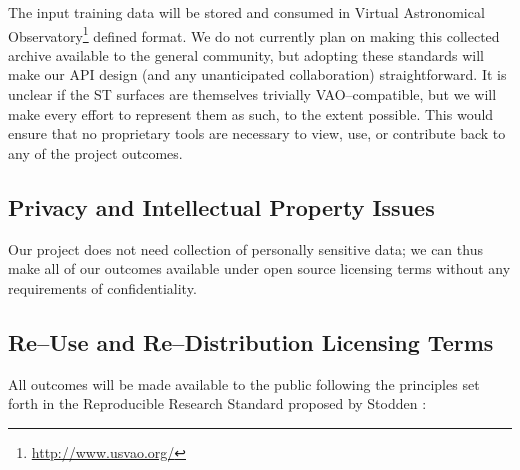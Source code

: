 \documentclass[11pt]{article}
\begin{document}
The input training data will be stored and consumed in Virtual Astronomical
Observatory\footnote{\url{http://www.usvao.org/}} defined format.  We do not
currently plan on making this collected archive available to the general
community, but adopting these standards will make our API design (and any
unanticipated collaboration) straightforward.  It is unclear if the ST surfaces
are themselves trivially VAO--compatible, but we will make every effort to
represent them as such, to the extent possible.  This would ensure that no
proprietary tools are necessary to view, use, or contribute back to any of the
project outcomes.

\subsection*{Privacy and Intellectual Property Issues}

Our project does not need collection of personally sensitive data; we can thus
make all of our outcomes available under open source licensing terms without any
requirements of confidentiality.


\subsection*{Re--Use and Re--Distribution Licensing Terms}

All outcomes will be made available to the public following the principles set
forth in the Reproducible Research Standard proposed by Stodden
\cite{Stodden-09}:
\end{document}
